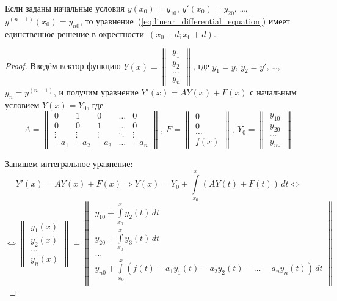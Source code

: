 \begin{theorem}
Если заданы начальные условия $y(x_0) = y_{10}$, $y'(x_0) = y_{20}$, \ldots, $y^{(n-1)}(x_0) = y_{n0}$, то уравнение~(\ref*{eq:linear_differential_equation}) имеет единственное решение в окрестности~$(x_0 - d; x_0 + d)$.
\end{theorem}
\begin{proof}
Введём вектор-функцию $Y(x) =
\begin{Vmatrix}
y_1 \\
y_2 \\
\ldots \\
y_n
\end{Vmatrix}$, где $y_1 = y$, $y_2 = y'$, \ldots, $y_n = y^{(n-1)}$,
и получим уравнение $Y'(x) = A Y(x) + F(x)$ с начальным условием $Y(x) = Y_0$, где
\begin{equation*}
A =
\begin{Vmatrix}
0 & 1 & 0 & \ldots & 0 \\
0 & 0 & 1 & \ldots & 0 \\
\vdots & \vdots & \vdots & \ddots & \vdots \\
-a_1 & -a_2 & -a_3 & \ldots & -a_n
\end{Vmatrix}, \
F =
\begin{Vmatrix}
0 \\
0 \\
\ldots \\
f(x)
\end{Vmatrix}, \
Y_0 =
\begin{Vmatrix}
y_{10} \\
y_{20} \\
\ldots \\
y_{n0}
\end{Vmatrix}
\end{equation*}

Запишем интегральное уравнение:
\begin{equation*}
Y'(x) = A Y(x) + F(x) \Rightarrow
Y(x) = Y_0 + \int\limits_{x_0}^x (A Y(t) + F(t))\,dt \Leftrightarrow
\end{equation*}
\begin{equation*}
\Leftrightarrow \begin{Vmatrix}
y_1(x) \\
y_2(x) \\
\ldots \\
y_n(x)
\end{Vmatrix} =
\begin{Vmatrix}
y_{10} + \int\limits_{x_0}^x y_2(t)\,dt \\
y_{20} + \int\limits_{x_0}^x y_3(t)\,dt \\
\ldots \\
y_{n0} + \int\limits_{x_0}^x (f(t) - a_1 y_1(t) - a_2 y_2(t) - \ldots - a_n y_n(t))\,dt \\
\end{Vmatrix}
\end{equation*}


\end{proof}
